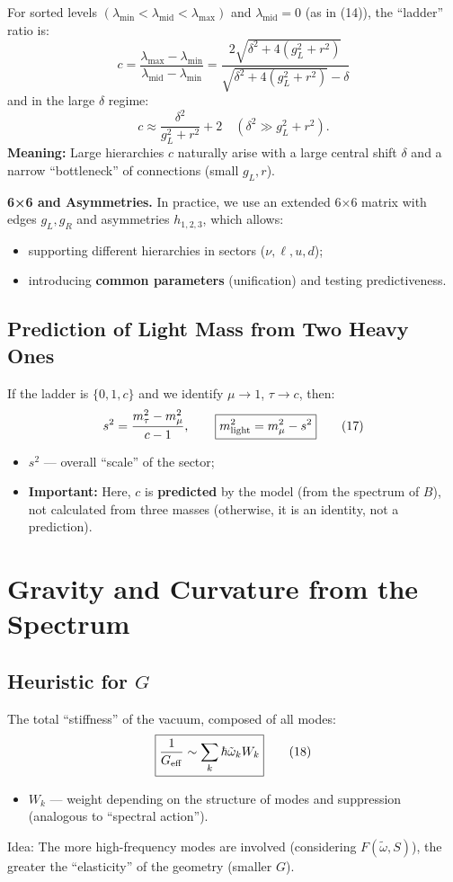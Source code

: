 \documentclass[12pt,a4paper]{article}
\begin{document}
For sorted levels \((\lambda_{\min} < \lambda_{\mathrm{mid}} < \lambda_{\max})\) and \(\lambda_{\mathrm{mid}} = 0\) (as in (14)), the ``ladder'' ratio is:
\[
\boxed{
c = \frac{\lambda_{\max} - \lambda_{\min}}{\lambda_{\mathrm{mid}} - \lambda_{\min}}
= \frac{2 \sqrt{\delta^2 + 4(g_L^2 + r^2)}}{\sqrt{\delta^2 + 4(g_L^2 + r^2)} - \delta}
} \tag{15}
\]
and in the large \(\delta\) regime:
\[
\boxed{c \approx \frac{\delta^2}{g_L^2 + r^2} + 2} \quad (\delta^2 \gg g_L^2 + r^2). \tag{16}
\]
\textbf{Meaning:} Large hierarchies \(c\) naturally arise with a large central shift \(\delta\) and a narrow ``bottleneck'' of connections (small \(g_L, r\)).

\textbf{6×6 and Asymmetries.} In practice, we use an extended 6×6 matrix with edges \(g_L, g_R\) and asymmetries \(h_{1,2,3}\), which allows:
\begin{itemize}
    \item supporting different hierarchies in sectors (\(\nu, \ell, u, d\));
    \item introducing \textbf{common parameters} (unification) and testing predictiveness.
\end{itemize}

\subsection{Prediction of Light Mass from Two Heavy Ones}
If the ladder is \(\{0, 1, c\}\) and we identify \(\mu \to 1\), \(\tau \to c\), then:
\[
s^2 = \frac{m_\tau^2 - m_\mu^2}{c - 1}, \qquad
\boxed{m_{\rm light}^2 = m_\mu^2 - s^2} \tag{17}
\]
\begin{itemize}
    \item \(s^2\) — overall ``scale'' of the sector;
    \item \textbf{Important:} Here, \(c\) is \textbf{predicted} by the model (from the spectrum of \(B\)), not calculated from three masses (otherwise, it is an identity, not a prediction).
\end{itemize}

\section{Gravity and Curvature from the Spectrum}

\subsection{Heuristic for \(G\)}
The total ``stiffness'' of the vacuum, composed of all modes:
\[
\boxed{\frac{1}{G_{\rm eff}} \sim \sum_k \hbar \tilde{\omega}_k W_k} \tag{18}
\]
\begin{itemize}
    \item \(W_k\) — weight depending on the structure of modes and suppression (analogous to ``spectral action'').
\end{itemize}
Idea: The more high-frequency modes are involved (considering \(F(\tilde{\omega}, S)\)), the greater the ``elasticity'' of the geometry (smaller \(G\)).
\end{document}
